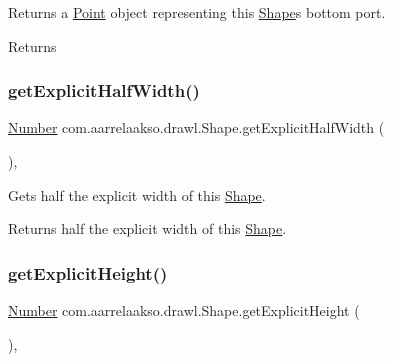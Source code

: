 Returns a \hyperlink{classcom_1_1aarrelaakso_1_1drawl_1_1_point}{Point} object representing this \hyperlink{classcom_1_1aarrelaakso_1_1drawl_1_1_shape}{Shape}\textquotesingle{}s bottom port. 

\begin{DoxyReturn}{Returns}

\end{DoxyReturn}
\mbox{\label{classcom_1_1aarrelaakso_1_1drawl_1_1_shape_a3acdc2fd1944e2efacd0bfbb8aefe89b}} 
\subsubsection{\texorpdfstring{get\+Explicit\+Half\+Width()}{getExplicitHalfWidth()}}
{\footnotesize\ttfamily \hyperlink{interfacecom_1_1aarrelaakso_1_1drawl_1_1_number}{Number} com.\+aarrelaakso.\+drawl.\+Shape.\+get\+Explicit\+Half\+Width (\begin{DoxyParamCaption}{ }\end{DoxyParamCaption})\hspace{0.3cm}{\ttfamily [protected]}, {\ttfamily [inherited]}}



Gets half the explicit width of this \hyperlink{classcom_1_1aarrelaakso_1_1drawl_1_1_shape}{Shape}. 

\begin{DoxyReturn}{Returns}
half the explicit width of this \hyperlink{classcom_1_1aarrelaakso_1_1drawl_1_1_shape}{Shape}. 
\end{DoxyReturn}
\mbox{\label{classcom_1_1aarrelaakso_1_1drawl_1_1_shape_a48917787cedbfd447cd37edbb59a1145}} 
\subsubsection{\texorpdfstring{get\+Explicit\+Height()}{getExplicitHeight()}}
{\footnotesize\ttfamily \hyperlink{interfacecom_1_1aarrelaakso_1_1drawl_1_1_number}{Number} com.\+aarrelaakso.\+drawl.\+Shape.\+get\+Explicit\+Height (\begin{DoxyParamCaption}{ }\end{DoxyParamCaption})\hspace{0.3cm}{\ttfamily [protected]}, {\ttfamily [inherited]}}



